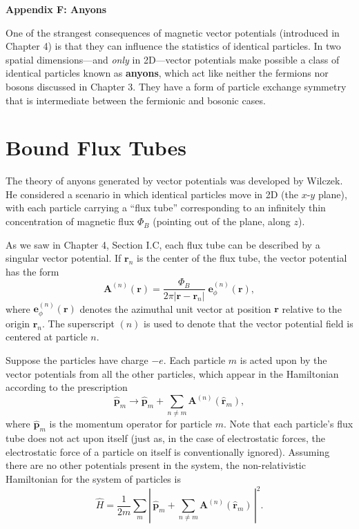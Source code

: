 \documentclass[pra,12pt]{revtex4}
\begin{document}
\begin{center}
{\large \textbf{Appendix F: Anyons}}
\end{center}

One of the strangest consequences of magnetic vector potentials
(introduced in Chapter 4) is that they can influence the statistics of
identical particles.  In two spatial dimensions---and \textit{only} in
2D---vector potentials make possible a class of identical particles
known as \textbf{anyons}, which act like neither the fermions nor
bosons discussed in Chapter 3.  They have a form of particle exchange
symmetry that is intermediate between the fermionic and bosonic cases.

\section{Bound Flux Tubes}

The theory of anyons generated by vector potentials was developed by
Wilczek.  He considered a scenario in which identical particles move
in 2D (the $x$-$y$ plane), with each particle carrying a ``flux tube''
corresponding to an infinitely thin concentration of magnetic flux
$\Phi_B$ (pointing out of the plane, along $z$).

As we saw in Chapter 4, Section I.C, each flux tube can be described
by a singular vector potential.  If $\mathbf{r}_n$ is the center of
the flux tube, the vector potential has the form
\begin{equation}
  \mathbf{A}^{(n)}(\mathbf{r}) = \frac{\Phi_B}{2\pi
    |\mathbf{r}-\mathbf{r}_n|} \; \mathbf{e}_\phi^{(n)}(\mathbf{r}),
  \label{Asolenoid}
\end{equation}
where $\mathbf{e}_\phi^{(n)}(\mathbf{r})$ denotes the azimuthal unit
vector at position $\mathbf{r}$ relative to the origin $\mathbf{r}_n$.
The superscript $(n)$ is used to denote that the vector potential
field is centered at particle $n$.

Suppose the particles have charge $-e$.  Each particle $m$ is acted
upon by the vector potentials from all the other particles, which
appear in the Hamiltonian according to the prescription
\begin{equation}
  \hat{\mathbf{p}}_m \rightarrow \hat{\mathbf{p}}_m
  + \sum_{n \ne m} \mathbf{A}^{(n)}(\hat{\mathbf{r}}_m),
\end{equation}
where $\hat{\mathbf{p}}_m$ is the momentum operator for particle $m$.
Note that each particle's flux tube does not act upon itself (just as,
in the case of electrostatic forces, the electrostatic force of a
particle on itself is conventionally ignored).  Assuming there are no
other potentials present in the system, the non-relativistic
Hamiltonian for the system of particles is
\begin{equation}
  \hat{H} = \frac{1}{2m} \sum_m \left| \,\hat{\mathbf{p}}_m
  + \sum_{n \ne m} \mathbf{A}^{(n)}(\hat{\mathbf{r}}_m)\,\right|^2.
\end{equation}
\end{document}

